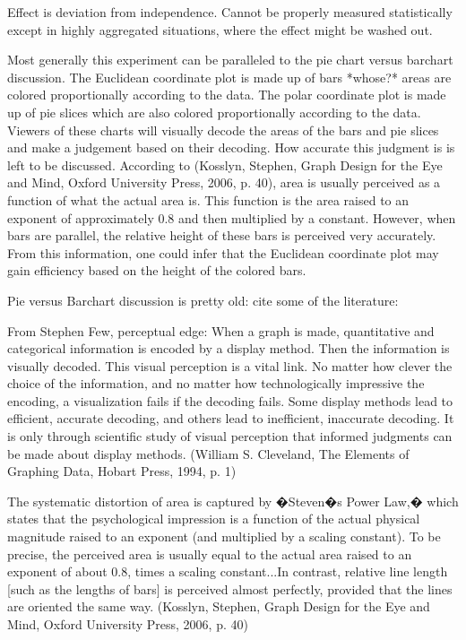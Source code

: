 Effect is deviation from independence. Cannot be properly measured statistically except in highly aggregated situations, where the effect might be washed out.

Most generally this experiment can be paralleled to the pie chart versus barchart discussion. The Euclidean coordinate plot is made up of bars *whose?* areas are colored proportionally according to the data. The polar coordinate plot is made up of pie slices which are also colored proportionally according to the data. Viewers of these charts will visually decode the areas of the bars and pie slices and make a judgement based on their decoding. How accurate this judgment is is left to be discussed. According to (Kosslyn, Stephen, Graph Design for the Eye and Mind, Oxford University Press, 2006, p. 40), area is usually perceived as a function of what the actual area is. This function is the area raised to an exponent of approximately 0.8 and then multiplied by a constant. However, when bars are parallel, the relative height of these bars is perceived very accurately. From this information, one could infer that the Euclidean coordinate plot may gain efficiency based on the height of the colored bars. 


Pie versus Barchart discussion is pretty old: cite some of the literature:

From Stephen Few, perceptual edge:
	When a graph is made, quantitative and categorical information is encoded by a display method. Then the information is visually decoded. This visual perception is a vital link. No matter how clever the choice of the information, and no matter how technologically impressive the encoding, a visualization fails if the decoding fails. Some display methods lead to efficient, accurate decoding, and others lead to inefficient, inaccurate decoding. It is only through scientific study of visual perception that informed judgments can be made about display methods. (William S. Cleveland, The Elements of Graphing Data, Hobart Press, 1994, p. 1)
	
	The systematic distortion of area is captured by �Steven�s Power Law,� which states that the psychological impression is a function of the actual physical magnitude raised to an exponent (and multiplied by a scaling constant). To be precise, the perceived area is usually equal to the actual area raised to an exponent of about 0.8, times a scaling constant...In contrast, relative line length [such as the lengths of bars] is perceived almost perfectly, provided that the lines are oriented the same way. (Kosslyn, Stephen, Graph Design for the Eye and Mind, Oxford University Press, 2006, p. 40)
	
